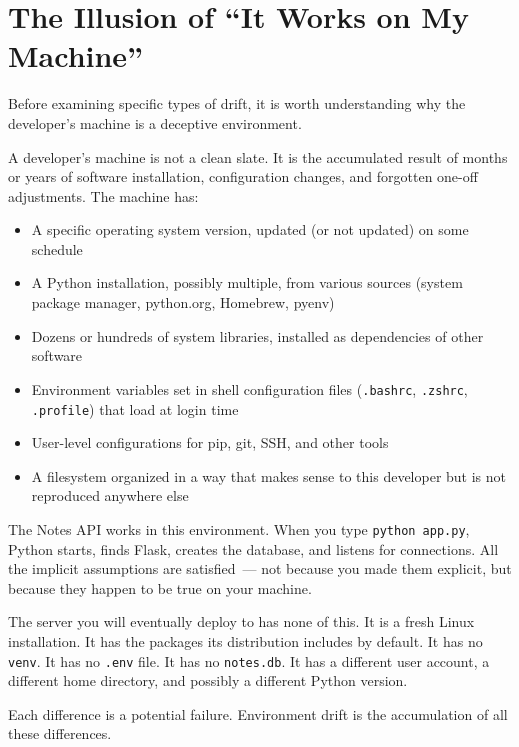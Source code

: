 \setcounter{section}{0}
\section{The Illusion of ``It Works on My Machine''}\label{07-environment-drift:71-the-illusion-of-it-works-on-my-machine}

Before examining specific types of drift, it is worth understanding why the developer's machine is a deceptive environment.

A developer's machine is not a clean slate. It is the accumulated result of months or years of software installation, configuration changes, and forgotten one-off adjustments. The machine has:

\begin{itemize}
\tightlist
\item
  A specific operating system version, updated (or not updated) on some schedule
\item
  A Python installation, possibly multiple, from various sources (system package manager, python.org, Homebrew, pyenv)
\item
  Dozens or hundreds of system libraries, installed as dependencies of other software
\item
  Environment variables set in shell configuration files (\texttt{.bashrc}, \texttt{.zshrc}, \texttt{.profile}) that load at login time
\item
  User-level configurations for pip, git, SSH, and other tools
\item
  A filesystem organized in a way that makes sense to this developer but is not reproduced anywhere else
\end{itemize}

\noindent{}The Notes API works in this environment. When you type \texttt{python\ app.py}, Python starts, finds Flask, creates the database, and listens for connections. All the implicit assumptions are satisfied~--- not because you made them explicit, but because they happen to be true on your machine.

The server you will eventually deploy to has none of this. It is a fresh Linux installation. It has the packages its distribution includes by default. It has no \texttt{venv}. It has no \texttt{.env} file. It has no \texttt{notes.db}. It has a different user account, a different home directory, and possibly a different Python version.

Each difference is a potential failure. Environment drift is the accumulation of all these differences.

